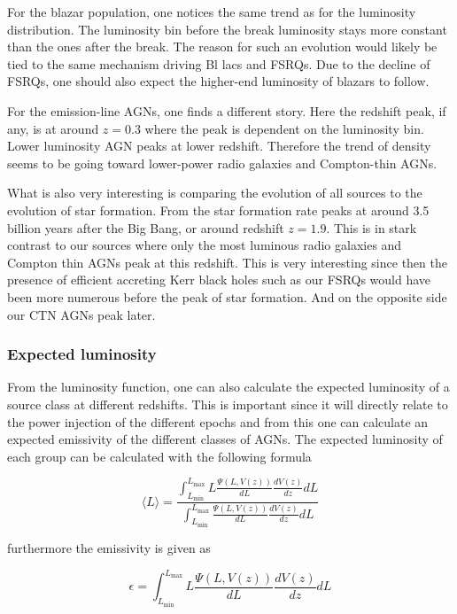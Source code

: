 \documentclass{article}
\begin{document}
For the blazar population, one notices the same trend as for the luminosity distribution. The luminosity bin before the break luminosity stays more constant than the ones after the break. The reason for such an evolution 
would likely be tied to the same mechanism driving Bl lacs and FSRQs. Due to the decline of FSRQs, one should also expect the
higher-end luminosity of blazars to follow.

For the emission-line AGNs, one finds a different story. Here the redshift peak, if any, is at around $z=0.3$ where the peak is dependent on the luminosity bin. Lower luminosity AGN peaks at lower redshift. Therefore the trend of density 
seems to be going toward lower-power radio galaxies and Compton-thin AGNs. 

What is also very interesting is comparing the evolution of all sources to 
the evolution of star formation. From \cite{Madau_2014} the star formation rate peaks at around 3.5 billion years after the Big Bang, 
or around redshift $z= 1.9$. This is in stark contrast to our sources where only the most luminous radio galaxies and Compton thin AGNs peak at this redshift. 
This is very interesting since then the presence of efficient accreting Kerr black holes such as our FSRQs would have been more numerous before the peak of star formation. 
And on the opposite side our CTN AGNs peak later. 


\subsubsection{Expected luminosity}
From the luminosity function, one can also calculate the expected luminosity of a source class at different redshifts. This is important since it will directly relate to the 
power injection of the different epochs and from this one can calculate an expected emissivity of the different classes of AGNs. 
The expected luminosity of each group can be calculated with the following formula

\begin{equation}
    \langle L \rangle = \frac{\int_{L_{\text{min}}}^{L_{\text{max}}} L \frac{\Psi(L, V(z))}{dL} \frac{dV(z)}{dz} dL}{\int_{L_{\text{min}}}^{L_{\text{max}}} \frac{\Psi(L, V(z))}{dL} \frac{dV(z)}{dz} dL}
\end{equation}

furthermore the emissivity is given as


\begin{equation}
     \epsilon  = \int_{L_{\text{min}}}^{L_{\text{max}}} L \frac{\Psi(L, V(z))}{dL} \frac{dV(z)}{dz} dL
\end{equation}
\end{document}
